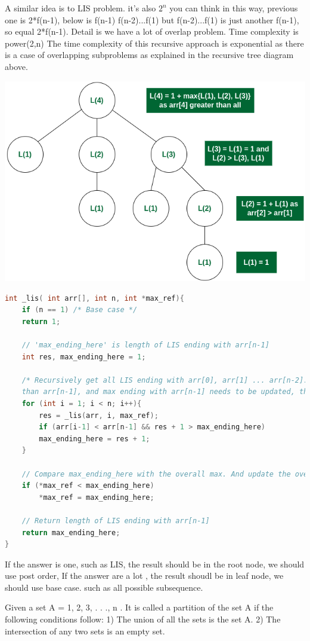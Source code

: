 \documentclass[a4paper,11pt,twoside]{book}
\begin{document}
	\par A similar idea is to LIS problem. it's also $2^n$
	you can think in this way, previous one is 2*f(n-1), below is f(n-1) f(n-2)...f(1)
	but f(n-2)...f(1) is just another f(n-1), so equal 2*f(n-1). Detail is we have a lot of overlap problem.
	Time complexity is power(2,n) The time complexity of this recursive approach is exponential as there is a case of overlapping subproblems as explained in the recursive tree diagram above.
	\begin{center}
		\includegraphics[width=0.5\linewidth]{pics/lis}
	\end{center}
	
\begin{lstlisting}[frame=single, language=c++]
int _lis( int arr[], int n, int *max_ref){
	if (n == 1) /* Base case */
	return 1;
	
	// 'max_ending_here' is length of LIS ending with arr[n-1]
	int res, max_ending_here = 1;
	
	/* Recursively get all LIS ending with arr[0], arr[1] ... arr[n-2]. If arr[i-1] is smaller
	than arr[n-1], and max ending with arr[n-1] needs to be updated, then update it */
	for (int i = 1; i < n; i++){
		res = _lis(arr, i, max_ref);
		if (arr[i-1] < arr[n-1] && res + 1 > max_ending_here)
		max_ending_here = res + 1;
	}
	
	// Compare max_ending_here with the overall max. And update the overall max if needed
	if (*max_ref < max_ending_here)
		*max_ref = max_ending_here;
	
	// Return length of LIS ending with arr[n-1]
	return max_ending_here;
}	
\end{lstlisting}	
	
	
	\par If the answer is one, such as LIS, the result should be in the root node, we should use post order, If the answer are a lot , the result shoudl be in leaf node, we should use base case. such as all possible subsequence. 
	
	
	\par Given a set A = {1, 2, 3, . . ., n }. It is called a partition of the set A if the following conditions follow: 1) The union of all the sets is the set A. 2) The intersection of any two sets is an empty set.
\end{document}
